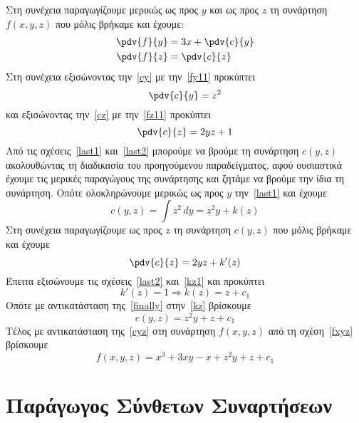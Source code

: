\documentclass[a4paper,table]{report}
\begin{document}
\begin{solution}
\begin{description}
\begin{equation}
      \end{equation}
      Στη συνέχεια παραγωγίζουμε μερικώς ως προς $y$ και ως προς $z$  
      τη συνάρτηση $f(x,y,z)$ που μόλις βρήκαμε και έχουμε:
      \begin{align}
        \pdv{f}{y} &= 3x + \pdv{c}{y} \label{cy} \\
        \pdv{f}{z} &= \pdv{c}{z} \label{cz}
      \end{align}
      Στη συνέχεια εξισώνοντας την~\eqref{cy} με την~\eqref{fy11} προκύπτει 
      \begin{equation}
        \pdv{c}{y} = z^{2} \label{last1}
      \end{equation}
      και εξισώνοντας την~\eqref{cz} με την~\eqref{fz11} προκύπτει
      \begin{equation}
        \pdv{c}{z} = 2yz+1 \label{last2}
      \end{equation}
      Από τις σχέσεις~\eqref{last1} και~\eqref{last2} μπορούμε να βρούμε τη συνάρτηση 
      $ c(y,z) $ ακολουθώντας τη διαδικασία του προηγούμενου παραδείγματος, αφού 
      ουσιαστικά έχουμε τις μερικές παραγώγους της συνάρτησης και ζητάμε 
      να βρούμε την ίδια τη συνάρτηση. Οπότε ολοκληρώνουμε μερικώς ως προς 
      $y$ την~\eqref{last1} και έχουμε
      \begin{equation}
        c(y,z) = \int z^{2} \,{dy} = z^{2}y + k(z) \label{kz} 
      \end{equation} 
      Στη συνέχεια παραγωγίζουμε ως προς $z$ τη συνάρτηση $ c(y,z) $ που μόλις βρήκαμε 
      και έχουμε
      \begin{equation}
        \pdv{c}{z} = 2yz + k'(z) \label{kz1}
      \end{equation} 
      Έπειτα εξισώνουμε τις σχέσεις~\eqref{last2} και~\eqref{kz1} και προκύπτει 
      \[
        k'(z) = 1 \Rightarrow k(z) = z + c_{1} \label{finally}
      \] 
      Οπότε με αντικατάσταση της~\eqref{finally} στην~\eqref{kz} βρίσκουμε 
      \begin{equation}
        c(y,z) = z^{2}y+z + c_{1} \label{cyz}
      \end{equation}
      Τέλος με αντικατάσταση της~\eqref{cyz} στη συνάρτηση $ f(x,y,z) $ από τη 
      σχέση~\eqref{fxyz} βρίσκουμε
      \[
        f(x,y,z) = x^{3}+3xy-x+z^{2}y+z+ c_{1} 
      \] 
  \end{description}
\end{solution}

\chapter{Παράγωγος Σύνθετων Συναρτήσεων}
\end{document}
